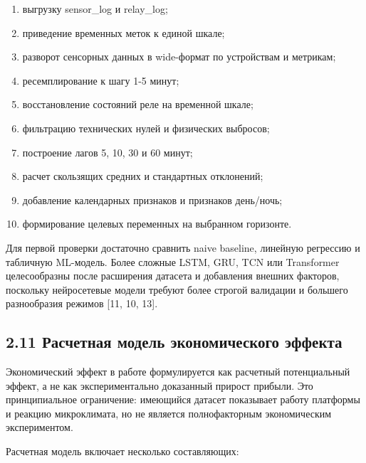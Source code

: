 \documentclass[a4paper,14pt]{extarticle}
\renewcommand{\texttt}[1]{\textnormal{#1}}
\providecommand{\tightlist}{%
  \setlength{\itemsep}{0pt}\setlength{\parskip}{0pt}}
\begin{document}
\begin{enumerate}
\def\labelenumi{\arabic{enumi})}
\tightlist
\item
  выгрузку \texttt{sensor\_log} и \texttt{relay\_log};
\item
  приведение временных меток к единой шкале;
\item
  разворот сенсорных данных в wide-формат по устройствам и метрикам;
\item
  ресемплирование к шагу 1-5 минут;
\item
  восстановление состояний реле на временной шкале;
\item
  фильтрацию технических нулей и физических выбросов;
\item
  построение лагов 5, 10, 30 и 60 минут;
\item
  расчет скользящих средних и стандартных отклонений;
\item
  добавление календарных признаков и признаков день/ночь;
\item
  формирование целевых переменных на выбранном горизонте.
\end{enumerate}

Для первой проверки достаточно сравнить naive baseline, линейную
регрессию и табличную ML-модель. Более сложные LSTM, GRU, TCN или
Transformer целесообразны после расширения датасета и добавления внешних
факторов, поскольку нейросетевые модели требуют более строгой валидации
и большего разнообразия режимов {[}11, 10, 13{]}.

\hypertarget{ux440ux430ux441ux447ux435ux442ux43dux430ux44f-ux43cux43eux434ux435ux43bux44c-ux44dux43aux43eux43dux43eux43cux438ux447ux435ux441ux43aux43eux433ux43e-ux44dux444ux444ux435ux43aux442ux430}{%
\subsection{2.11 Расчетная модель экономического
эффекта}\label{ux440ux430ux441ux447ux435ux442ux43dux430ux44f-ux43cux43eux434ux435ux43bux44c-ux44dux43aux43eux43dux43eux43cux438ux447ux435ux441ux43aux43eux433ux43e-ux44dux444ux444ux435ux43aux442ux430}}

Экономический эффект в работе формулируется как расчетный потенциальный
эффект, а не как экспериментально доказанный прирост прибыли. Это
принципиальное ограничение: имеющийся датасет показывает работу
платформы и реакцию микроклимата, но не является полнофакторным
экономическим экспериментом.

Расчетная модель включает несколько составляющих:
\end{document}
